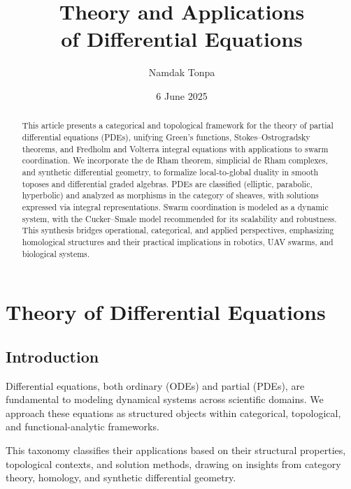 \documentclass{article}
\theoremstyle{plain}
\begin{document}
\title{Theory and Applications \\ of Differential Equations}
\author{Namdak Tonpa}
\date{6 June 2025}
\maketitle

\begin{abstract}
This article presents a categorical and topological framework for the theory
of partial differential equations (PDEs), unifying Green's functions,
Stokes--Ostrogradsky theorems, and Fredholm and Volterra integral
equations with applications to swarm coordination. We incorporate
the de Rham theorem, simplicial de Rham complexes,
and synthetic differential geometry, to formalize
local-to-global duality in smooth toposes and differential graded algebras.
PDEs are classified (elliptic, parabolic, hyperbolic) and
analyzed as morphisms in the category of sheaves, with solutions expressed
via integral representations. Swarm coordination is modeled as a dynamic
system, with the Cucker--Smale model recommended for its scalability and
robustness. This synthesis bridges operational, categorical, and applied
perspectives, emphasizing homological structures and their practical
implications in robotics, UAV swarms, and biological systems.
\end{abstract}


\tableofcontents

\section{Theory of Differential Equations}

\subsection{Introduction}

Differential equations, both ordinary (ODEs) and partial (PDEs),
are fundamental to modeling dynamical systems across scientific domains.
We approach these equations as structured objects within categorical,
topological, and functional-analytic frameworks.

This taxonomy classifies their applications based on their structural properties,
topological contexts, and solution methods, drawing on insights from category theory,
homology, and synthetic differential geometry.
\end{document}
